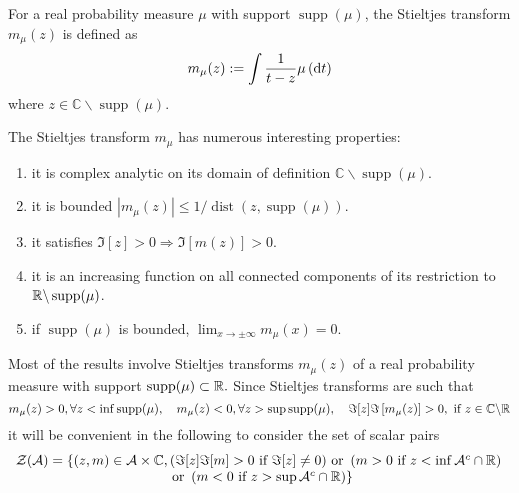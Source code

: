\begin{definition}
	For a real probability measure $\mu$ with support $\operatorname{supp}(\mu)$, the Stieltjes transform $m_{\mu}(z)$ is defined as
	\begin{equation}
		m_{\mu}(z):=\int\frac{1}{t-z}\mu\left(\mathop{}\!\mathrm{d} t\right)
	\end{equation}
	where $z\in\mathbb{C}\backslash\operatorname{supp}(\mu)$.
\end{definition}

\begin{property}
	The Stieltjes transform $m_{\mu}$ has numerous interesting properties:
	\begin{enumerate}
		\item it is complex analytic on its domain of definition $\mathbb{C} \backslash \operatorname{supp}(\mu)$.
		\item it is bounded $\left|m_{\mu}(z)\right|\leq 1/\operatorname{dist}(z,\operatorname{supp}(\mu))$.
		\item it satisfies $\Im[z]>0 \Rightarrow \Im[m(z)]>0$.
		\item it is an increasing function on all connected components of its restriction to ${\mathbb R}\backslash\operatorname{supp}(\mu)$. %
		\item if $\operatorname{supp}(\mu)$ is bounded, $\lim_{x\rightarrow\pm\infty}m_{\mu}(x)=0$.
	\end{enumerate}
\end{property}

\begin{remark}
	Most of the results involve Stieltjes transforms $m_{\mu}(z)$ of a real probability measure with support $\operatorname{supp}(\mu) \subset {\mathbb R} .$ Since Stieltjes transforms are such that
	\begin{equation*}
		m_{\mu}(z)>0,\forall z<\inf\operatorname{supp}(\mu),\quad m_{\mu}(z)<0,\forall z>\sup \operatorname{supp}(\mu),\quad\Im[z] \Im\left[m_{\mu}(z)\right]>0,\text{ if }z\in\mathbb{C}\backslash{\mathbb R}
	\end{equation*}
	it will be convenient in the following to consider the set of scalar pairs
	\begin{equation*}
		\begin{array}{c}
			\mathcal{Z}(\mathcal{A})=\left\{(z,m)\in\mathcal{A}\times\mathbb{C},(\Im[z]\Im[m]>0\text{ if } \Im[z] \neq 0)\text{ or }\left(m>0\text{ if }z<\inf \mathcal{A}^{c} \cap {\mathbb R}\right)\right. \\
			\left.\text{ or }\left(m<0\text{ if }z>\sup \mathcal{A}^{c} \cap {\mathbb R}\right)\right\}
		\end{array}
	\end{equation*}
\end{remark}

